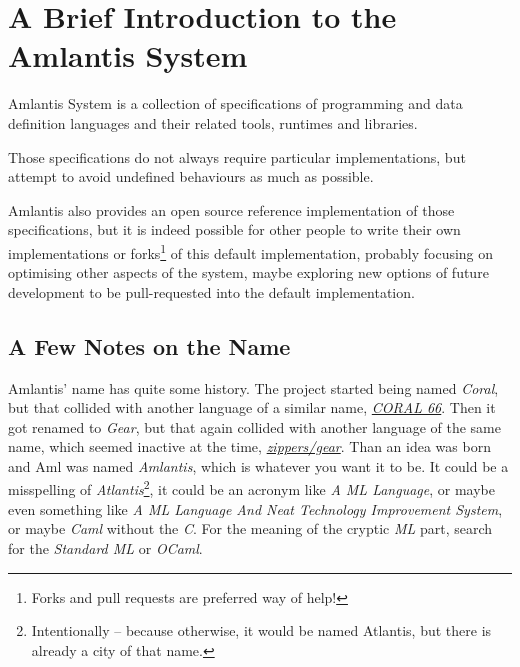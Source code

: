 
\chapter*{A Brief Introduction to the Amlantis System}
\label{sec:brief-intro}

Amlantis System is a collection of specifications of programming and data definition languages and their related tools, runtimes and libraries. 

Those specifications do not always require particular implementations, but attempt to avoid undefined behaviours as much as possible. 

Amlantis also provides an open source reference implementation of those specifications, but it is indeed possible for other people to write their own implementations or forks\footnote{Forks and pull requests are preferred way of help!} of this default implementation, probably focusing on optimising other aspects of the system, maybe exploring new options of future development to be pull-requested into the default implementation. 





\section*{A Few Notes on the Name}

Amlantis' name has quite some history. The project started being named {\em Coral}, but that collided with another language of a similar name, \href{https://en.wikipedia.org/wiki/Coral_66}{{\em CORAL 66}}. Then it got renamed to {\em Gear}, but that again collided with another language of the same name, which seemed inactive at the time, \href{https://github.com/zippers/gear}{{\em zippers/gear}}. Than an idea was born and Aml was named {\em Amlantis}, which is whatever you want it to be. It could be a misspelling of {\em Atlantis}\footnote{Intentionally -- because otherwise, it would be named Atlantis, but there is already a city of that name.}, it could be an acronym like {\em A ML Language}, or maybe even something like {\em A ML Language And Neat Technology Improvement System}, or maybe {\em Caml} without the {\em C}. For the meaning of the cryptic {\em ML} part, search for the {\em Standard ML} or {\em OCaml}. 





\newpage

